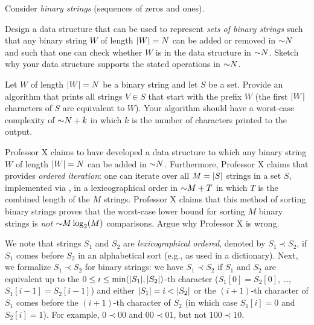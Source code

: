 \begin{problem}
Consider \emph{binary strings} (sequences of zeros and ones). 
\begin{questions}
\item Design a data structure  that can be used to represent \emph{sets of binary strings} such that any binary string $W$ of length $\lvert W \rvert = N$ can be added or removed in $\mathord{\sim}N$ and such that one can check whether $W$ is in the data structure in $\mathord{\sim}N$. Sketch why your data structure   supports the stated operations in $\mathord{\sim}N$.
\item Let $W$ of length $\lvert W \rvert = N$ be a binary string and let $S$ be a  set. Provide an algorithm that prints all strings $V \in S$ that start with the prefix $W$ (the first $\lvert W \rvert$ characters of $S$ are equivalent to $W$). Your algorithm should have a worst-case complexity of $\mathord{\sim}N + k$ in which $k$ is the number of characters printed to the output.
\item Professor X claims to have developed a data structure  to which any binary string $W$ of length $\lvert W \rvert = N$ can be added in $\mathord{\sim}N$. Furthermore, Professor X claims that   provides \emph{ordered iteration}: one can iterate over all $M = \lvert S \rvert$ strings in a set $S$, implemented via , in a lexicographical order in $\mathord{\sim}M + T$ in which $T$ is the combined length of the $M$ strings. Professor X claims that this method of sorting binary strings proves that the worst-case lower bound for sorting $M$ binary strings is \emph{not} $\mathord{\sim}M \log_2(M)$ comparisons. Argue why Professor X is wrong.

We note that strings $S_1$ and $S_2$ are \emph{lexicographical ordered}, denoted by $S_1 \prec S_2$, if $S_1$ comes before $S_2$ in an alphabetical sort (e.g., as used in a dictionary). Next, we formalize $S_1 \prec S_2$ for binary strings: we have $S_1 \prec S_2$ if $S_1$ and $S_2$ are equivalent up to the $0\leq i \leq \min(\lvert S_1 \rvert, \lvert S_2 \rvert)$-th character ($S_1[0] = S_2[0]$,
\dots, $S_1[i-1] = S_2[i-1]$) and either $\lvert S_1 \rvert = i < \lvert S_2 \rvert$ or the $(i+1)$-th character of $S_1$ comes before the $(i+1)$-th character of $S_2$ (in which case $S_1[i] = 0$ and $S_2[i] = 1$). For example, $0 \prec 00$ and $00 \prec 01$, but not $100 \prec 10$. 
\end{questions}
\end{problem}

\SUBMITMSG{}
\DEFAULTGRADING{}

